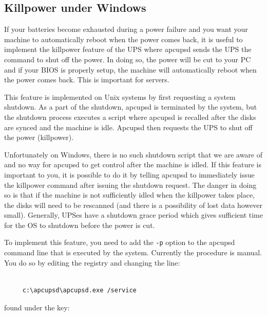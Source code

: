 {{{{{{{{{{\label{Killpower-under-Windows}

\subsection*{Killpower under Windows}

\label{index-Windows_002c-Killpower-183}
If your batteries become exhausted during a power failure and you want your
machine to automatically reboot when the power comes back, it is useful to
implement the killpower feature of the UPS where apcupsd sends the UPS the
command to shut off the power.  In doing so, the power will be cut to your PC
and if your BIOS is properly setup, the machine will automatically reboot when
the power comes back. This is important for servers.  

This feature is implemented on Unix systems by first requesting a system
shutdown. As a part of the shutdown, apcupsd is terminated by the system, but
the shutdown process executes a script where apcupsd is recalled after the
disks are synced and the machine is idle. Apcupsd then requests the UPS to
shut off the power (killpower).  

Unfortunately on Windows, there is no such shutdown script that we are aware
of and no way for apcupsd to get control after the machine is idled. If this
feature is important to you, it is possible to do it by telling apcupsd to
immediately issue the killpower command after issuing the shutdown request.
The danger in doing so is that if the machine is not sufficiently idled when
the killpower takes place, the disks will need to be rescanned (and there is a
possibility of lost data however small). Generally, UPSes have a shutdown
grace period which gives sufficient time for the OS to shutdown before the
power is cut.  

To implement this feature, you need to add the {\tt -p} option to the apcupsd
command line that is executed by the system.  Currently the procedure is
manual. You do so by editing the registry and changing the line: 

\footnotesize
\begin{verbatim}
     
     c:\apcupsd\apcupsd.exe /service
\end{verbatim}
\normalsize

found under the key: 

\footnotesize
\begin{verbatim}
     

\end{verbatim}}}}}}}}}}}
